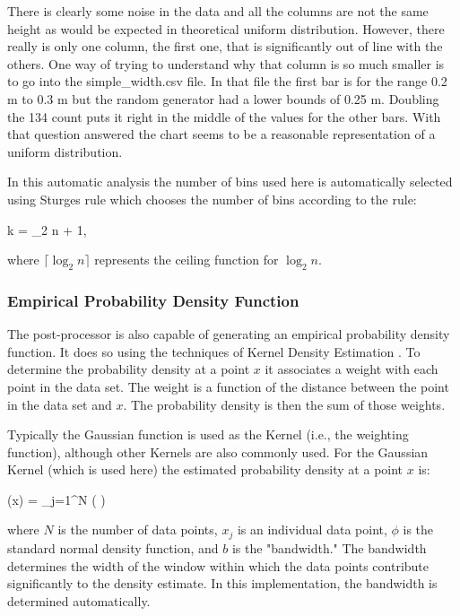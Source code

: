 \documentclass[12pt,twoside]{book}
\begin{document}
There is clearly some noise in the data and all the columns are not the same height as would be expected in theoretical uniform distribution. However, there really is only one column, the first one, that is significantly out of line with the others. One way of trying to understand why that column is so much smaller is to go into the {\ct simple\_width.csv} file. In that file the first bar is for the range 0.2 m to 0.3 m but the random generator had a lower bounds of 0.25 m. Doubling the 134 count  puts it right in the middle of the values for the other bars. With that question answered the chart seems to be a reasonable representation of a uniform distribution.

In this automatic analysis the number of bins used here is automatically selected using Sturges rule \cite{Sturges_1926} which chooses the number of bins according to the rule:

\be
k = \lceil \log_2 n \rceil + 1,
\ee

where  $\lceil \log_2 n \rceil$ represents the ceiling function for $ \log_2 n$.

\subsubsection{Empirical Probability Density Function}

The post-processor is also capable of generating an empirical probability density function. It does so using the techniques of Kernel Density Estimation \cite{Haste_2009}. To determine the probability density at a point $x$ it associates a weight with each point in the data set. The weight is a function of the distance between the point in the data set and $x$. The probability density is then the sum of those weights.

Typically the Gaussian function is used as the Kernel (i.e., the weighting function), although other Kernels are also commonly used. For the Gaussian Kernel (which is used here) the estimated probability density at a point $x$ is:

\be
(x) = \sum_{j=1}^{N} \phi\left( \right)
\ee

where $N$ is the number of data points, $x_j$ is an individual data point, $\phi$ is the standard normal density function, and $b$ is the "bandwidth." The bandwidth determines the width of the window within which the data points contribute significantly to the density estimate. In this implementation, the bandwidth is determined automatically.
\end{document}
